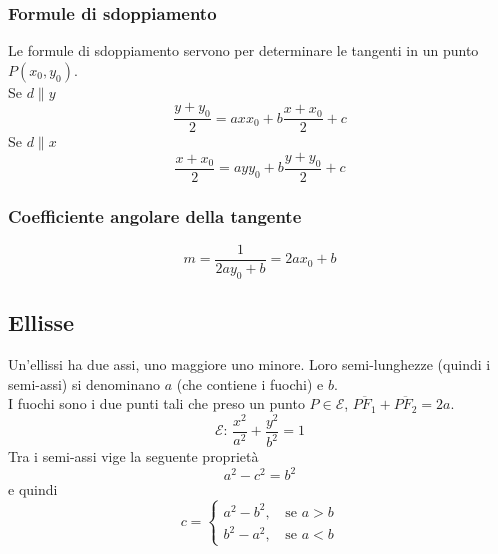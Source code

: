 \subsubsection{Formule di sdoppiamento}
Le formule di sdoppiamento servono per determinare le tangenti in un punto $P(x_0,y_0)$.\\
Se $d\|y$
\begin{equation*}
\frac{y+y_0}{2}=axx_0+b\frac{x+x_0}{2}+c
\end{equation*}
Se $d\|x$
\begin{equation*}
\frac{x+x_0}{2}=ayy_0+b\frac{y+y_0}{2}+c
\end{equation*}

\subsubsection{Coefficiente angolare della tangente}
\begin{equation*}
m = \frac{1}{2ay_0+b} = 2ax_0+b
\end{equation*}

\subsection{Ellisse}\label{subsec:geomanal:ellisse}
\begin{center}
\end{center}
Un'ellissi ha due assi, uno maggiore uno minore. Loro semi-lunghezze (quindi i semi-assi) si 
denominano $a$ (che contiene i fuochi) e $b$.\\
I fuochi sono i due punti tali che preso un punto $P\in\mathscr{E}$, 
$\overline{PF_1}+\overline{PF_2} = 2a$.
\begin{equation*}
\mathscr{E}:\,\frac{x^2}{a^2}+\frac{y^2}{b^2}=1
\end{equation*}
Tra i semi-assi vige la seguente proprietà
\begin{equation*}
a^2-c^2=b^2
\end{equation*}
e quindi
\begin{equation*}
c = \begin{cases}
a^2-b^2,\, &\text{se } a > b\\
b^2-a^2,\, &\text{se } a < b
\end{cases}
\end{equation*}


